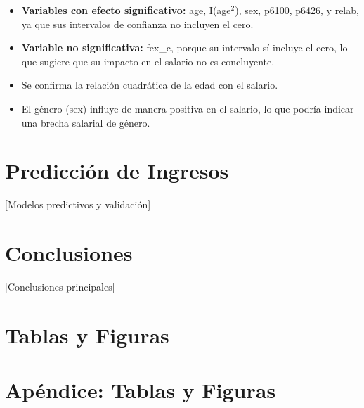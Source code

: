 \documentclass[12pt,a4paper,onecolumn]{article}
\begin{document}
\begin{itemize}
    \item \textbf{Variables con efecto significativo:} age, I(age$^2$), sex, p6100, p6426, y relab, ya que sus intervalos de confianza no incluyen el cero.

    \item \textbf{Variable no significativa:} fex\_c, porque su intervalo sí incluye el cero, lo que sugiere que su impacto en el salario no es concluyente.

    \item Se confirma la relación cuadrática de la edad con el salario.

    \item El género (sex) influye de manera positiva en el salario, lo que podría indicar una brecha salarial de género.
\end{itemize}

\section{Predicción de Ingresos}
[Modelos predictivos y validación]

\section{Conclusiones}
[Conclusiones principales]


\pagebreak
\singlespacing

\pagebreak

\section*{Tablas y Figuras}


\pagebreak

\appendix
\renewcommand{\theequation}{\Alph{chapter}.\arabic{equation}}

\setcounter{figure}{0}
\setcounter{table}{0}
\makeatletter 
\renewcommand{\thefigure}{A.\@arabic\c@figure}
\renewcommand{\thetable}{A.\@arabic\c@table}

\section{Apéndice: Tablas y Figuras}\label{sec:appendix_tables} 
\end{document}
